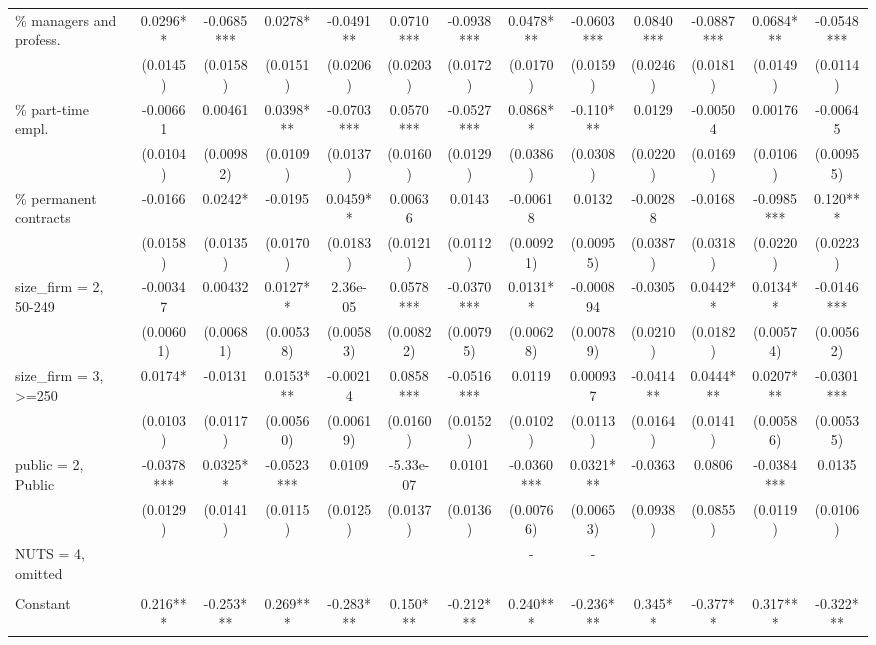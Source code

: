 \documentclass[]{article}
\begin{document}
\begin{tabular}{lcccccccccccc}
\% managers and profess. & 0.0296** & -0.0685*** & 0.0278* & -0.0491** & 0.0710*** & -0.0938*** & 0.0478*** & -0.0603*** & 0.0840*** & -0.0887*** & 0.0684*** & -0.0548*** \\
 & (0.0145) & (0.0158) & (0.0151) & (0.0206) & (0.0203) & (0.0172) & (0.0170) & (0.0159) & (0.0246) & (0.0181) & (0.0149) & (0.0114) \\
\% part-time empl. & -0.00661 & 0.00461 & 0.0398*** & -0.0703*** & 0.0570*** & -0.0527*** & 0.0868** & -0.110*** & 0.0129 & -0.00504 & 0.00176 & -0.00645 \\
 & (0.0104) & (0.00982) & (0.0109) & (0.0137) & (0.0160) & (0.0129) & (0.0386) & (0.0308) & (0.0220) & (0.0169) & (0.0106) & (0.00955) \\
\% permanent contracts & -0.0166 & 0.0242* & -0.0195 & 0.0459** & 0.00636 & 0.0143 & -0.00618 & 0.0132 & -0.00288 & -0.0168 & -0.0985*** & 0.120*** \\
 & (0.0158) & (0.0135) & (0.0170) & (0.0183) & (0.0121) & (0.0112) & (0.00921) & (0.00955) & (0.0387) & (0.0318) & (0.0220) & (0.0223) \\
size\_firm = 2, 50-249 & -0.00347 & 0.00432 & 0.0127** & 2.36e-05 & 0.0578*** & -0.0370*** & 0.0131** & -0.000894 & -0.0305 & 0.0442** & 0.0134** & -0.0146*** \\
 & (0.00601) & (0.00681) & (0.00538) & (0.00583) & (0.00822) & (0.00795) & (0.00628) & (0.00789) & (0.0210) & (0.0182) & (0.00574) & (0.00562) \\
size\_firm = 3, >=250 & 0.0174* & -0.0131 & 0.0153*** & -0.00214 & 0.0858*** & -0.0516*** & 0.0119 & 0.000937 & -0.0414** & 0.0444*** & 0.0207*** & -0.0301*** \\
 & (0.0103) & (0.0117) & (0.00560) & (0.00619) & (0.0160) & (0.0152) & (0.0102) & (0.0113) & (0.0164) & (0.0141) & (0.00586) & (0.00535) \\
public = 2, Public & -0.0378*** & 0.0325** & -0.0523*** & 0.0109 & -5.33e-07 & 0.0101 & -0.0360*** & 0.0321*** & -0.0363 & 0.0806 & -0.0384*** & 0.0135 \\
 & (0.0129) & (0.0141) & (0.0115) & (0.0125) & (0.0137) & (0.0136) & (0.00766) & (0.00653) & (0.0938) & (0.0855) & (0.0119) & (0.0106) \\
NUTS = 4, omitted &  &  &  &  &  &  & - & - &  &  &  &  \\
 &  &  &  &  &  &  &  &  &  &  &  &  \\
Constant & 0.216*** & -0.253*** & 0.269*** & -0.283*** & 0.150*** & -0.212*** & 0.240*** & -0.236*** & 0.345** & -0.377** & 0.317*** & -0.322*** \\

\end{tabular}
\end{document}
